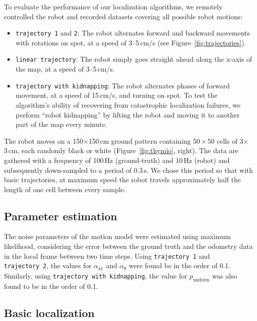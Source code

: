 \documentclass[letterpaper, 10pt, conference]{ieeeconf}
\newcommand{\fig}[1]{Figure~\ref{fig:#1}}
\begin{document}
To evaluate the performance of our localization algorithms, we remotely controlled the robot and recorded datasets covering all possible robot motions:
\begin{itemize}
\item \texttt{trajectory 1} and \texttt{2}: The robot alternates forward and backward movements with rotations on spot, at a speed of 3--5\,cm/s (see \fig{trajectories}).
\item \texttt{linear trajectory}: The robot simply goes straight ahead along the x-axis of the map, at a speed of 3--5\,cm/s.
\item \texttt{trajectory with kidnapping}: The robot alternates phases of forward movement, at a speed of 15\,cm/s, and turning on spot.
To test the algorithm's ability of recovering from catastrophic localization failures, we perform ``robot kidnapping'' by lifting the robot and moving it to another part of the map every minute.
\end{itemize}
The robot moves on a 150$\times$150\,cm ground pattern containing 50\,$\times$\,50 cells of 3$\times$3\,cm, each randomly black or white (\fig{thymio}, right).
The data are gathered with a frequency of 100\,Hz (ground-truth) and 10\,Hz (robot) and subsequently down-sampled to a period of 0.3\,s.
We chose this period so that with basic trajectories, at maximum speed the robot travels approximately half the length of one cell between every sample.

\subsection{Parameter estimation}
\label{sec:mle}

The noise parameters of the motion model were estimated using maximum likelihood, considering the error between the ground truth and the odometry data in the local frame between two time steps.
Using \texttt{trajectory~1} and \texttt{trajectory~2}, the values for  $\alpha_\mathrm{xy}$ and $\alpha_\theta$ were found be in the order of 0.1.
Similarly, using \texttt{trajectory with kidnapping}, the value for $p_\mathrm{uniform}$ was also found to be in the order of 0.1.

\subsection{Basic localization}
\end{document}
